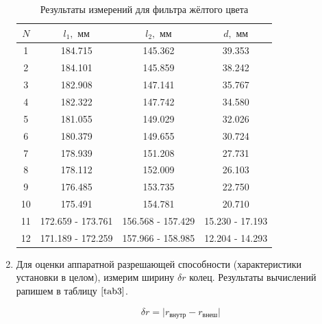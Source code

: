 \documentclass[a4paper,12pt]{article} %
\begin{document}
\begin{enumerate}
    \begin{table}[h]
        \centering
        \begin{tabular}{|c|c|c|c|}
        \hline
    	$N$ & $l_{\text{1}}, \text{ мм}$ & $l_{\text{2}}, \text{ мм}$ & $d, \text{ мм}$ \\ \hline
    	1 & 184.715 & 145.362 & 39.353 \\ \hline
    	2 & 184.101 & 145.859 & 38.242 \\ \hline
    	3 & 182.908 & 147.141 & 35.767 \\ \hline
    	4 & 182.322 & 147.742 & 34.580 \\ \hline
    	5 & 181.055 & 149.029 & 32.026 \\ \hline
    	6 & 180.379 & 149.655 & 30.724 \\ \hline
            7 & 178.939 & 151.208 & 27.731 \\ \hline
    	8 & 178.112 & 152.009 & 26.103 \\ \hline
    	9 & 176.485 & 153.735 & 22.750 \\ \hline
    	10 & 175.491 & 154.781 & 20.710 \\ \hline
    	11 & 172.659 - 173.761 & 156.568 - 157.429 & 15.230 - 17.193 \\ \hline
    	12 & 171.189 - 172.259 & 157.966 - 158.985 & 12.204 - 14.293 \\ \hline
        \end{tabular}
    \caption{Результаты измерений для фильтра жёлтого цвета}
    \label{tab2}
    \end{table}

    \item Для оценки $\textit{аппаратной}$ разрешающей способности (характеристики установки в целом), измерим ширину $\delta r$ колец. Результаты вычислений рапишем в таблицу $\ref{tab3}$.

    \[ \delta r = \lvert r_{\text{внутр}} - r_{\text{внеш}}\rvert \]


\end{enumerate}
\end{document}

